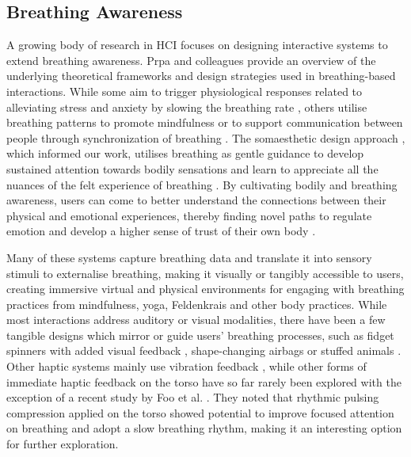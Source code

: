 \subsection{Breathing Awareness}

A growing body of research in HCI focuses on designing interactive systems to extend breathing awareness. Prpa and colleagues \cite{prpa_inhaling_2020} provide an overview of the underlying theoretical frameworks and design strategies used in breathing-based interactions. While some aim to trigger physiological responses related to alleviating stress and anxiety by slowing the breathing rate \cite{van_rooij_deep_2016, bumatay_investigating_2017, chill-out_2014}, others utilise breathing patterns to promote mindfulness \cite{pisa_towards_2017, shamekhi_breathe_2018} or to support communication between people through synchronization of breathing \cite{desnoyers-stewart_jel:_2019, kim_breathingframe_2015}. The somaesthetic design approach \cite{designing_2018}, which informed our work, utilises breathing as gentle guidance to develop sustained attention towards bodily sensations and learn to appreciate all the nuances of the felt experience of breathing \cite{prpa_attending_2018, stahl_soma_2016}. By cultivating bodily and breathing awareness, users can come to better understand the connections between their physical and emotional experiences, thereby finding novel paths to regulate emotion and develop a higher sense of trust of their own body \cite{bornemann_differential_2015}.

Many of these systems capture breathing data and translate it into sensory stimuli to externalise breathing, making it visually or tangibly accessible to users, creating immersive virtual and physical environments for engaging with breathing practices from mindfulness, yoga, Feldenkrais \cite{moran_exopranayama:_2016, patibanda_life_2017, vidyarthi_sonic_2012, stahl_soma_2016, shamekhi_breathe_2018} and other body practices. While most interactions address auditory or visual modalities, there have been a few tangible designs which mirror or guide users' breathing processes, such as fidget spinners with added visual feedback \cite{liang_biofidget_2018}, shape-changing airbags \cite{yu_breathe_2015} or stuffed animals \cite{aslan_hold_2016}. Other haptic systems mainly use vibration feedback \cite{dijk_breathe_2011,bumatay_investigating_2017, pardis}, while other forms of immediate haptic feedback on the torso have so far rarely been explored with the exception of a recent study by Foo et al. \cite{foo_2020}. They noted that rhythmic pulsing compression applied on the torso showed potential to improve focused attention on breathing and adopt a slow breathing rhythm, making it an interesting option for further exploration.

